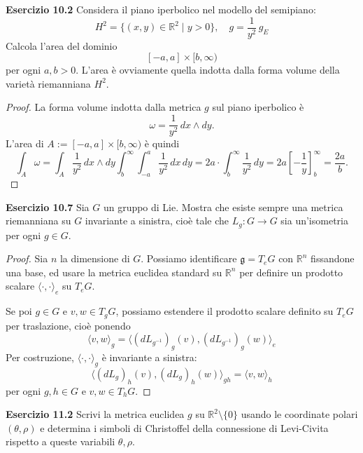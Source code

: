 \documentclass[a4paper]{article}
\newcommand{\R}{\mathbb{R}}
\theoremstyle{definition}
\theoremstyle{definition}
\theoremstyle{remark}
\theoremstyle{definition}
\begin{document}
\textbf{Esercizio 10.2}
Considera il piano iperbolico nel modello del semipiano:
\[
	H^2 = \{(x, y) \in \R^2 \mid y > 0\}, \quad g = \frac{1}{y^2} \, g_E
\]
Calcola l'area del dominio
\[
	[-a, a] \times [b, \infty)
\] per ogni $a, b > 0$. L'area è ovviamente quella indotta dalla forma volume della varietà riemanniana $H^2$.
\begin{proof}
	La forma volume indotta dalla metrica $g$ sul piano iperbolico è
	\[
		\omega = \frac{1}{y^2} \, dx \wedge dy
		.\]
	L'area di $A:=[-a, a] \times [b, \infty)$ è quindi
	\[
		\int_A \omega = \int_A \frac{1}{y^2} \, dx \wedge dy
		\int_{b}^{\infty} \int_{-a}^{a} \frac{1}{y^2} \, dx \, dy = 2a\cdot \int_{b}^{\infty} \frac{1}{y^2} \, dy = 2a \left[ -\frac{1}{y} \right]_{b}^{\infty} = \frac{2a}{b}
		.\]
\end{proof}
\textbf{Esercizio 10.7}
Sia $G$ un gruppo di Lie. Mostra che esiste sempre una metrica riemanniana su $G$ invariante a sinistra, cioè tale che $L_g : G \to G$ sia un'isometria per ogni $g \in G$.
\begin{proof}
	Sia $n$ la dimensione di $G$. Possiamo identificare $\mathfrak{g}=T_eG$ con $\R^n$ fissandone una base, ed usare la metrica euclidea standard su $\R^n$ per
	definire un prodotto scalare $\langle \cdot, \cdot \rangle_e$ su $T_eG$.

	Se poi $g \in G$ e $v, w \in T_gG$, possiamo estendere il prodotto scalare definito su $T_eG$ per traslazione, cioè ponendo
	\[
		\langle v, w \rangle_g = \langle (dL_{g^{-1}})_g(v), (dL_{g^{-1}})_g(w) \rangle_e
	\]
	Per costruzione, $\langle \cdot, \cdot \rangle_g$ è invariante a sinistra:
	\[
		\langle (dL_g)_h(v), (dL_g)_h(w) \rangle_{gh} = \langle v, w \rangle_h
	\]
	per ogni $g, h \in G$ e $v, w \in T_hG$.

\end{proof}

\textbf{Esercizio 11.2}
Scrivi la metrica euclidea $g$ su $\R^2 \setminus \{0\}$ usando le coordinate polari $(\theta, \rho)$ e determina i simboli di Christoffel della connessione di Levi-Civita rispetto a queste variabili $\theta, \rho$.
\end{document}
